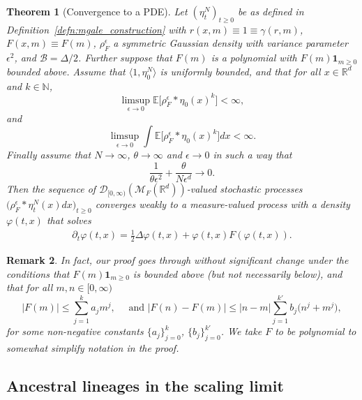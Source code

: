\documentclass[12pt]{article}
\newtheorem{theorem}{Theorem}[section]
\newtheorem{remark}[theorem]{Remark}
\newcommand{\IE}{\mathbb E}
\newcommand{\IR}{\mathbb R}
\newcommand{\IN}{\mathbb N}
\newcommand{\ind}{\mathbf{1}}
\newcommand{\DG}{\mathcal{B}}  %
\newcommand{\measures}{\mathcal{M}_F(\IR^d)} %
\numberwithin{equation}{section}
\begin{document}
\begin{theorem}[Convergence to a PDE]
    \label{thm:local_convergence}
    Let $(\eta^N_t)_{t \geq 0}$
    be as defined in Definition~\ref{defn:mgale_construction} with
$r(x,m)\equiv 1\equiv \gamma(r,m)$, $F(x,m)\equiv F(m)$, 
$\rho^\epsilon_F$ a symmetric Gaussian density with variance
parameter $\epsilon^2$,
and $\DG=\Delta/2$. 
Further suppose that $F(m)$ is a polynomial with $F(m)\ind_{m\geq 0}$ bounded above.
Assume that $\langle 1,\eta_0^N\rangle$ is uniformly bounded, and that for all 
$x\in\IR^d$ and $k\in \IN$,
	\[
		\limsup_{\epsilon\to 0} 
		\IE\big[\rho_F^\epsilon*\eta_0(x)^k\big]<\infty,
	\]
	and 
\[
    \limsup_{\epsilon \to 0} \int \IE\big[\rho_F^\epsilon*\eta_0(x)^k\big] dx<\infty.
\]
Finally assume that $N \to \infty$, $\theta \to \infty$
and $\epsilon \to 0$ in such a way that
\begin{equation}
\frac{1}{\theta\epsilon^2}+\frac{\theta}{N\epsilon^d}\to 0.
\end{equation}
Then the sequence of 
    ${\mathcal D}_{[0,\infty)}(\measures)$-valued
stochastic processes $\big(\rho_F^\epsilon*\eta^N_t(x)dx\big)_{t \ge 0}$
converges weakly
to a measure-valued process with a density $\varphi(t, x)$
that solves
\begin{align}
	\label{target equation in local convergence}
        \partial_t \varphi(t,x) = \frac{1}{2} \Delta \varphi(t,x) +\varphi(t,x) F(\varphi(t,x)).
\end{align}
\end{theorem}

\begin{remark}
In fact,
our proof goes through without significant change under the conditions that
$F(m)\ind_{m\geq 0}$ is bounded above (but not necessarily below), and that
for all $m,n\in[0,\infty)$
\[
|F(m)|\leq\sum_{j=1}^ka_jm^j, \quad\mbox{ and }
|F(n)-F(m)|
\leq|n-m|\sum_{j=1}^{k'}b_j\Big(n^j+m^j\Big),
\]
for some non-negative constants $\{a_j\}_{j=0}^k$, $\{b_j\}_{j=0}^{k'}$.
We take $F$ to be polynomial to somewhat simplify notation in the proof.
\end{remark}

\subsection{Ancestral lineages in the scaling limit}
\label{sec:ancestral lineages}
\end{document}
